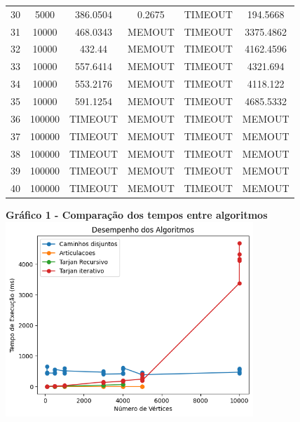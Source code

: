 \begin{table}[htb]
\begin{tabular}{c|c|c|c|c|c}
30 & 5000 & 386.0504 & 0.2675 & TIMEOUT & 194.5668\\
31 & 10000 & 468.0343 & MEMOUT & TIMEOUT & 3375.4862\\
32 & 10000 & 432.44 & MEMOUT & TIMEOUT & 4162.4596\\
33 & 10000 & 557.6414 & MEMOUT & TIMEOUT & 4321.694\\
34 & 10000 & 553.2176 & MEMOUT & TIMEOUT & 4118.122\\
35 & 10000 & 591.1254 & MEMOUT & TIMEOUT & 4685.5332\\
36 & 100000 & TIMEOUT & MEMOUT & TIMEOUT & MEMOUT\\
37 & 100000 & TIMEOUT & MEMOUT & TIMEOUT & MEMOUT\\
38 & 100000 & TIMEOUT & MEMOUT & TIMEOUT & MEMOUT\\
39 & 100000 & TIMEOUT & MEMOUT & TIMEOUT & MEMOUT\\
40 & 100000 & TIMEOUT & MEMOUT & TIMEOUT & MEMOUT\\
     \hline
 \end{tabular}
 	\vspace{.1cm}  %
	\small

	
\end{table}

\begin{center}
	\centering	
 	\textbf{Gráfico 1 - Comparação dos tempos entre algoritmos} \\
	\includegraphics[width=0.7\textwidth]{figuras/resultadosGraf.png}
	 \vspace{-0.3cm}
	
	\label{grafico1}
\end{center}
 
